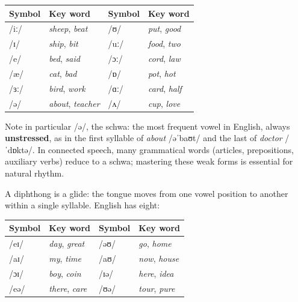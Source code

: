 \documentclass[11pt]{article}
\newcommand{\cle}[1]{{\popxbold\color{popdark}#1}}
\newcounter{popsec}
\newcounter{popsub}
\newcommand{\courssub}[1]{%
  \stepcounter{popsub}%
  \par\vspace{9pt}\noindent{\popxbold\fontsize{11.5}{13}\selectfont\color{popink}{\color{poporange}\thepopsec.\thepopsub}\hspace{6pt}#1}\par\nopagebreak\vspace{4pt}
}
\begin{document}
\begin{center}
\begin{tabularx}{\linewidth}{|l|X|l|X|}
\hline
\rowcolor{popblueL} \textbf{Symbol} & \textbf{Key word} & \textbf{Symbol} & \textbf{Key word} \\
\hline
/iː/ & \emph{sheep}, \emph{beat} & /ʊ/ & \emph{put}, \emph{good} \\
\hline
/ɪ/ & \emph{ship}, \emph{bit} & /uː/ & \emph{food}, \emph{two} \\
\hline
/e/ & \emph{bed}, \emph{said} & /ɔː/ & \emph{cord}, \emph{law} \\
\hline
/æ/ & \emph{cat}, \emph{bad} & /ɒ/ & \emph{pot}, \emph{hot} \\
\hline
/ɜː/ & \emph{bird}, \emph{work} & /ɑː/ & \emph{card}, \emph{half} \\
\hline
/ə/ & \emph{about}, \emph{teacher} & /ʌ/ & \emph{cup}, \emph{love} \\
\hline
\end{tabularx}
\end{center}

Note in particular /ə/, the \cle{schwa}: the most frequent vowel in English, always \textbf{unstressed}, as in the first syllable of \emph{about} /əˈbaʊt/ and the last of \emph{doctor} /ˈdɒktə/. In connected speech, many grammatical words (articles, prepositions, auxiliary verbs) reduce to a schwa; mastering these \cle{weak forms} is essential for natural rhythm.

\courssub{Diphthongs}

A \cle{diphthong} is a glide: the tongue moves from one vowel position to another within a single syllable. English has eight:

\begin{center}
\begin{tabularx}{\linewidth}{|l|X|l|X|}
\hline
\rowcolor{popblueL} \textbf{Symbol} & \textbf{Key word} & \textbf{Symbol} & \textbf{Key word} \\
\hline
/eɪ/ & \emph{day}, \emph{great} & /əʊ/ & \emph{go}, \emph{home} \\
\hline
/aɪ/ & \emph{my}, \emph{time} & /aʊ/ & \emph{now}, \emph{house} \\
\hline
/ɔɪ/ & \emph{boy}, \emph{coin} & /ɪə/ & \emph{here}, \emph{idea} \\
\hline
/eə/ & \emph{there}, \emph{care} & /ʊə/ & \emph{tour}, \emph{pure} \\
\hline
\end{tabularx}
\end{center}
\end{document}
